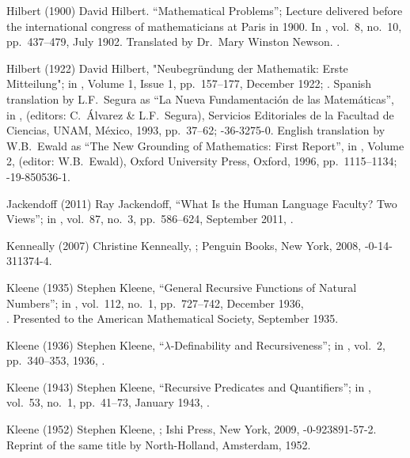  Hilbert (1900)
David Hilbert.
``Mathematical Problems'';
Lecture delivered before the international
congress of mathematicians at Paris in 1900.
In ,
vol.\ 8, no.\ 10, pp.\ 437--479, July 1902.
Translated by Dr.\ Mary Winston Newson.
.

 Hilbert (1922)
David Hilbert,
\gqql"Neubegr\"undung der Mathematik: Erste Mitteilung\gqqr";
in ,
Volume 1, Issue 1, pp.~157--177, December 1922;
.
Spanish translation by L.F.\ Segura as
``La Nueva Fundamentaci\'on de las Matem\'aticas'',
in ,
 (editors: C.\ \'Alvarez \& L.F.\ Segura),
Servicios Editoriales de la Facultad de Ciencias, UNAM,
M\'exico, 1993, pp.~37--62;
-36-3275-0.
English translation by W.B.\ Ewald as
``The New Grounding of Mathematics: First Report'',
in , Volume 2,
 (editor: W.B.\ Ewald),
Oxford University Press, Oxford, 1996, pp.~1115--1134;
-19-850536-1.

 Jackendoff (2011)
Ray Jackendoff,
``What Is the Human Language Faculty? Two Views'';
in ,
vol.\ 87, no.\ 3, pp.\ 586--624, September 2011,
.

 Kenneally (2007)
Christine Kenneally,
;
Penguin Books, New York, 2008,
-0-14-311374-4.

 Kleene (1935)
Stephen Kleene,
``General Recursive Functions of Natural Numbers'';
in ,
vol.\ 112, no.\ 1, pp.\ 727--742, December 1936,\\
.
Presented to the American Mathematical Society,
September 1935.

 Kleene (1936)
Stephen Kleene,
``$\lambda$-Definability and Recursiveness'';
in ,
vol.\ 2, pp.\ 340--353, 1936,
.

 Kleene (1943)
Stephen Kleene,
``Recursive Predicates and Quantifiers'';
in ,
vol.\ 53, no.\ 1, pp.\ 41--73, January 1943,
.

 Kleene (1952)
Stephen Kleene,
;
Ishi Press, New York, 2009,
-0-923891-57-2.
Reprint of the same title by
North-Holland, Amsterdam, 1952.

